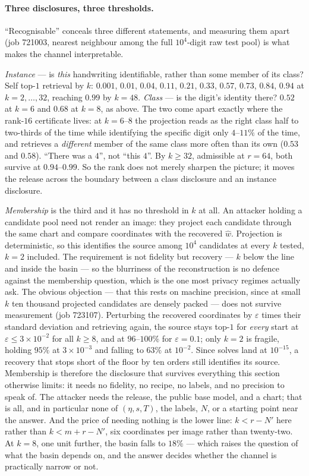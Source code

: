 \paragraph{Three disclosures, three thresholds.} ``Recognisable'' conceals
three different statements, and measuring them apart (job 721003, nearest
neighbour among the full $10^4$-digit raw test pool) is what makes the channel
interpretable.

\emph{Instance} --- is \emph{this} handwriting identifiable, rather than some
member of its class? Self top-$1$ retrieval by $k$: $0.001$, $0.01$, $0.04$,
$0.11$, $0.21$, $0.33$, $0.57$, $0.73$, $0.84$, $0.94$ at
$k=2,\dots,32$, reaching $0.99$ by $k=48$. \emph{Class} --- is the digit's
identity there? $0.52$ at $k=6$ and $0.68$ at $k=8$, as above. The two come
apart exactly where the rank-$16$ certificate lives: at $k=6$--$8$ the
projection reads as the right class half to two-thirds of the time while
identifying the specific digit only $4$--$11\%$ of the time, and retrieves a
\emph{different} member of the same class more often than its own ($0.53$ and
$0.58$). ``There was a $4$'', not ``this $4$''. By $k\ge32$, admissible at
$r=64$, both survive at $0.94$--$0.99$. So the rank does not merely sharpen
the picture; it moves the release across the boundary between a class
disclosure and an instance disclosure.

\emph{Membership} is the third and it has no threshold in $k$ at all. An
attacker holding a candidate pool need not render an image: they project each
candidate through the same chart and compare coordinates with the recovered
$\hat w$. Projection is deterministic, so this identifies the source among
$10^4$ candidates at every $k$ tested, $k=2$ included. The requirement is not
fidelity but recovery --- $k$ below the line and inside the basin --- so the
blurriness of the reconstruction is no defence against the membership
question, which is the one most privacy regimes actually ask. The obvious objection --- that this rests
on machine precision, since at small $k$ ten thousand projected candidates are
densely packed --- does not survive measurement (job 723107). Perturbing the
recovered coordinates by $\varepsilon$ times their standard deviation and
retrieving again, the source stays top-$1$ for \emph{every} start at
$\varepsilon\le3\times10^{-2}$ for all $k\ge8$, and at $96$--$100\%$ for
$\varepsilon=0.1$; only $k=2$ is fragile, holding $95\%$ at
$3\times10^{-3}$ and falling to $63\%$ at $10^{-2}$. Since solves land at
$10^{-15}$, a recovery that stops short of the floor by ten orders still
identifies its source. Membership is therefore the disclosure that survives
everything this section otherwise limits: it needs no fidelity, no recipe, no
labels, and no precision to speak of. The attacker needs the
release, the public base model, and a chart; that is all, and in particular
none of $(\eta,s,T)$, the labels, $N$, or a starting point near the answer.
And the price of needing nothing is the lower line: $k<r-N'$ here rather than
$k<m+r-N'$, six coordinates per image rather than twenty-two. At $k=8$, one unit further, the
basin falls to $18\%$ --- which raises the question of what the basin depends
on, and the answer decides whether the channel is practically narrow or not.

